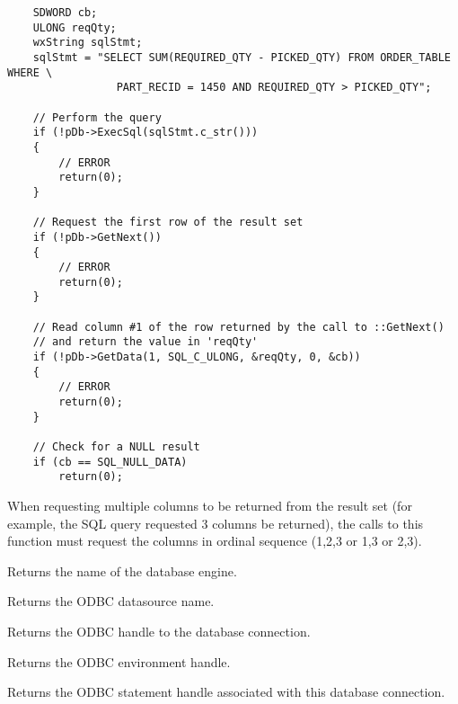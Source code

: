 \begin{verbatim}
    SDWORD cb;
    ULONG reqQty;
    wxString sqlStmt;
    sqlStmt = "SELECT SUM(REQUIRED_QTY - PICKED_QTY) FROM ORDER_TABLE WHERE \
                 PART_RECID = 1450 AND REQUIRED_QTY > PICKED_QTY";

    // Perform the query
    if (!pDb->ExecSql(sqlStmt.c_str()))
    {
        // ERROR
        return(0);
    }

    // Request the first row of the result set
    if (!pDb->GetNext())
    {
        // ERROR
        return(0);
    }

    // Read column #1 of the row returned by the call to ::GetNext()
    // and return the value in 'reqQty'
    if (!pDb->GetData(1, SQL_C_ULONG, &reqQty, 0, &cb))
    {
        // ERROR
        return(0);
    }

    // Check for a NULL result
    if (cb == SQL_NULL_DATA)
        return(0);
\end{verbatim}


When requesting multiple columns to be returned from the result set (for example, the SQL query
requested 3 columns be returned), the calls to this function must request the columns in ordinal
sequence (1,2,3 or 1,3 or 2,3).

\label{wxdbgetdatabasename}


Returns the name of the database engine.

\label{wxdbgetdatasourcename}


Returns the ODBC datasource name.

\label{wxdbgethdbc}


Returns the ODBC handle to the database connection.

\label{wxdbgethenv}


Returns the ODBC environment handle.

\label{wxdbgethstmt}


Returns the ODBC statement handle associated with this database connection.


